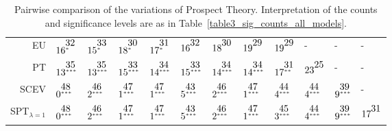 \begin{table}[!htb]
\begin{tabular}{rlllllllllll}
  EU & $16^{\stackrel{\textstyle32\hfill}{\scriptscriptstyle*\hfill}}$ & $15^{\stackrel{\textstyle33\hfill}{\scriptscriptstyle*\hfill}}$ & $18^{\stackrel{\textstyle30\hfill}{\scriptscriptstyle*\hfill}}$ & $17^{\stackrel{\textstyle31\hfill}{\scriptscriptstyle*\hfill}}$ & $16^{\stackrel{\textstyle32\hfill}{\scriptscriptstyle\hfill}}$ & $18^{\stackrel{\textstyle30\hfill}{\scriptscriptstyle\hfill}}$ & $19^{\stackrel{\textstyle29\hfill}{\scriptscriptstyle\hfill}}$ & $19^{\stackrel{\textstyle29\hfill}{\scriptscriptstyle\hfill}}$ & - & - & - \\ 
  PT & $13^{\stackrel{\textstyle35\hfill}{\scriptscriptstyle***\hfill}}$ & $13^{\stackrel{\textstyle35\hfill}{\scriptscriptstyle***\hfill}}$ & $15^{\stackrel{\textstyle33\hfill}{\scriptscriptstyle***\hfill}}$ & $14^{\stackrel{\textstyle34\hfill}{\scriptscriptstyle***\hfill}}$ & $15^{\stackrel{\textstyle33\hfill}{\scriptscriptstyle***\hfill}}$ & $14^{\stackrel{\textstyle34\hfill}{\scriptscriptstyle***\hfill}}$ & $14^{\stackrel{\textstyle34\hfill}{\scriptscriptstyle***\hfill}}$ & $17^{\stackrel{\textstyle31\hfill}{\scriptscriptstyle**\hfill}}$ & $23^{\stackrel{\textstyle25\hfill}{\scriptscriptstyle\hfill}}$ & - & - \\ 
  SCEV & $0^{\stackrel{\textstyle48\hfill}{\scriptscriptstyle***\hfill}}$ & $2^{\stackrel{\textstyle46\hfill}{\scriptscriptstyle***\hfill}}$ & $1^{\stackrel{\textstyle47\hfill}{\scriptscriptstyle***\hfill}}$ & $1^{\stackrel{\textstyle47\hfill}{\scriptscriptstyle***\hfill}}$ & $5^{\stackrel{\textstyle43\hfill}{\scriptscriptstyle***\hfill}}$ & $2^{\stackrel{\textstyle46\hfill}{\scriptscriptstyle***\hfill}}$ & $1^{\stackrel{\textstyle47\hfill}{\scriptscriptstyle***\hfill}}$ & $4^{\stackrel{\textstyle44\hfill}{\scriptscriptstyle***\hfill}}$ & $4^{\stackrel{\textstyle44\hfill}{\scriptscriptstyle***\hfill}}$ & $9^{\stackrel{\textstyle39\hfill}{\scriptscriptstyle***\hfill}}$ & - \\ 
  SPT$_{\lambda = 1}$ & $0^{\stackrel{\textstyle48\hfill}{\scriptscriptstyle***\hfill}}$ & $2^{\stackrel{\textstyle46\hfill}{\scriptscriptstyle***\hfill}}$ & $1^{\stackrel{\textstyle47\hfill}{\scriptscriptstyle***\hfill}}$ & $1^{\stackrel{\textstyle47\hfill}{\scriptscriptstyle***\hfill}}$ & $5^{\stackrel{\textstyle43\hfill}{\scriptscriptstyle***\hfill}}$ & $2^{\stackrel{\textstyle46\hfill}{\scriptscriptstyle***\hfill}}$ & $1^{\stackrel{\textstyle47\hfill}{\scriptscriptstyle***\hfill}}$ & $3^{\stackrel{\textstyle45\hfill}{\scriptscriptstyle***\hfill}}$ & $4^{\stackrel{\textstyle44\hfill}{\scriptscriptstyle***\hfill}}$ & $9^{\stackrel{\textstyle39\hfill}{\scriptscriptstyle***\hfill}}$ & $17^{\stackrel{\textstyle31\hfill}{\scriptscriptstyle\hfill}}$ \\ 
   \hline
\end{tabular}
\caption{Pairwise comparison of the variations of Prospect Theory. Interpretation of the counts and significance levels are as in Table~\ref{table3_sig_counts_all_models}.} 
\label{table5_sig_counts_PT_models}
\end{table}
